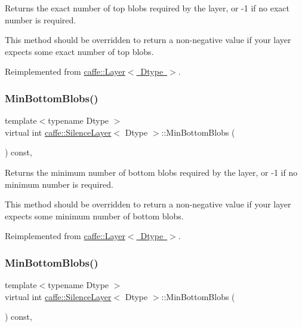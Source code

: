 Returns the exact number of top blobs required by the layer, or -\/1 if no exact number is required. 

This method should be overridden to return a non-\/negative value if your layer expects some exact number of top blobs. 

Reimplemented from \mbox{\hyperlink{classcaffe_1_1_layer_a64e2ca72c719e4b2f1f9216ccfb0d37f}{caffe\+::\+Layer$<$ Dtype $>$}}.

\mbox{\label{classcaffe_1_1_silence_layer_af916fa4138f5d8761ec4490588eeccd1}} 
\subsubsection{\texorpdfstring{Min\+Bottom\+Blobs()}{MinBottomBlobs()}\hspace{0.1cm}{\footnotesize\ttfamily [1/2]}}
{\footnotesize\ttfamily template$<$typename Dtype $>$ \\
virtual int \mbox{\hyperlink{classcaffe_1_1_silence_layer}{caffe\+::\+Silence\+Layer}}$<$ Dtype $>$\+::Min\+Bottom\+Blobs (\begin{DoxyParamCaption}{ }\end{DoxyParamCaption}) const\hspace{0.3cm}{\ttfamily [inline]}, {\ttfamily [virtual]}}



Returns the minimum number of bottom blobs required by the layer, or -\/1 if no minimum number is required. 

This method should be overridden to return a non-\/negative value if your layer expects some minimum number of bottom blobs. 

Reimplemented from \mbox{\hyperlink{classcaffe_1_1_layer_aca3cb2bafaefda5d4760aaebd0b72def}{caffe\+::\+Layer$<$ Dtype $>$}}.

\mbox{\label{classcaffe_1_1_silence_layer_af916fa4138f5d8761ec4490588eeccd1}} 
\subsubsection{\texorpdfstring{Min\+Bottom\+Blobs()}{MinBottomBlobs()}\hspace{0.1cm}{\footnotesize\ttfamily [2/2]}}
{\footnotesize\ttfamily template$<$typename Dtype $>$ \\
virtual int \mbox{\hyperlink{classcaffe_1_1_silence_layer}{caffe\+::\+Silence\+Layer}}$<$ Dtype $>$\+::Min\+Bottom\+Blobs (\begin{DoxyParamCaption}{ }\end{DoxyParamCaption}) const\hspace{0.3cm}{\ttfamily [inline]}, {\ttfamily [virtual]}}



